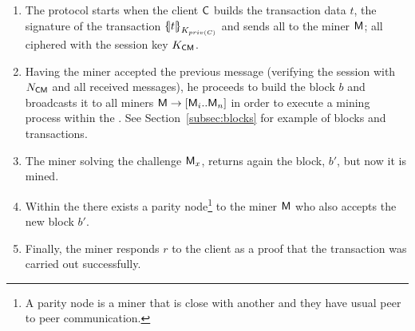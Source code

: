 \begin{enumerate}
    \item The protocol starts when the client $\textsf{C}$ builds the transaction 
        data $t$, the signature of the transaction $\fat{t}_{K_{priv(C)}}$ and sends
        all to the miner $\textsf{M}$; all ciphered with the 
        session key $K_{\textsf{C}\textsf{M}}$. 
    \item Having the miner accepted the previous message (verifying the  
        session with $N_{\textsf{C}\textsf{M}}$ and all received messages), he proceeds to build 
        the block $b$ and broadcasts it to all miners $\textsf{M}\rightarrow [\textsf{M}_i .. \textsf{M}_n]$
        in order to execute a mining process within the \blockchaincarnetwork.
        See Section~\ref{subsec:blocks} for example of blocks and transactions.

        
    \item The miner solving the challenge $\textsf{M}_x$, returns again the block, $b'$, 
        but now it is mined. 
    \item Within the \blockchaincarnetwork there exists a parity node\footnote{
            A parity node is a miner that is close with another and they have usual
            peer to peer communication.
        } to the miner $\textsf{M}$
        who also accepts the new block $b'$.
    \item Finally, the miner responds $r$ to the client as a proof that the transaction 
        was carried out successfully.
\end{enumerate}



